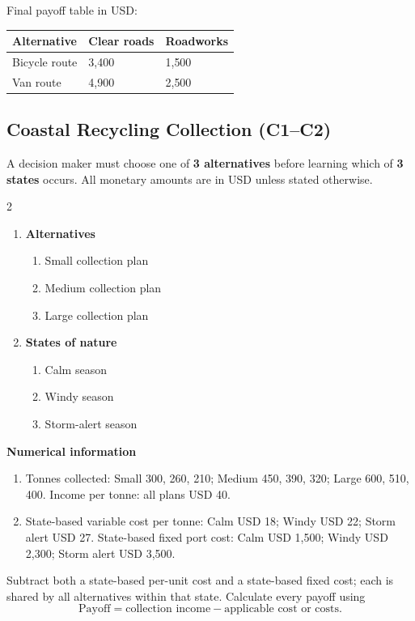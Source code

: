 Final payoff table in USD:
\begin{center}
\begin{tabular}{lll}
\toprule
Alternative & Clear roads & Roadworks \\
\midrule
Bicycle route & 3{,}400 & 1{,}500 \\
Van route & 4{,}900 & 2{,}500 \\
\bottomrule
\end{tabular}
\end{center}
\subsection{Coastal Recycling Collection (C1--C2)}
\label{sec:problem20-coastal-recycling-collection-c1-c2}
A decision maker must choose one of \textbf{3 alternatives} before learning which of \textbf{3 states} occurs. All monetary amounts are in USD unless stated otherwise.
\begin{multicols}{2}
\begin{enumerate}[label=\arabic*.]
 \item \textbf{Alternatives}
 \begin{enumerate}[label=\roman*)]
  \item Small collection plan
  \item Medium collection plan
  \item Large collection plan
 \end{enumerate}
 \item \textbf{States of nature}
 \begin{enumerate}[label=\roman*)]
  \item Calm season
  \item Windy season
  \item Storm-alert season
 \end{enumerate}
\end{enumerate}
\end{multicols}
 \textbf{Numerical information}
 \begin{enumerate}[label=\roman*)]
  \item Tonnes collected: Small 300, 260, 210; Medium 450, 390, 320; Large 600, 510, 400. Income per tonne: all plans USD 40.
  \item State-based variable cost per tonne: Calm USD 18; Windy USD 22; Storm alert USD 27. State-based fixed port cost: Calm USD 1,500; Windy USD 2,300; Storm alert USD 3,500.
 \end{enumerate}
Subtract both a state-based per-unit cost and a state-based fixed cost; each is shared by all alternatives within that state. Calculate every payoff using
\[
 \text{Payoff}=\text{collection income}-\text{applicable cost or costs}.
\]

